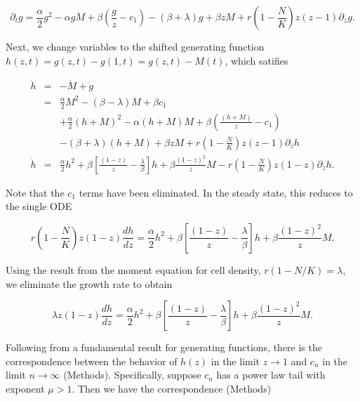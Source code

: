 \documentclass[12pt]{article}
\def\be{\begin{equation}}
\def\ee{\end{equation}}
\def\bea{\begin{eqnarray}}
\def\eea{\end{eqnarray}}
\begin{document}

\be
\partial_t g = \frac{\alpha}{2}g^2 - \alpha gM + \beta\left(\frac{g}{z} - c_1\right) - (\beta+\lambda)g + \beta zM +r\left(1-\frac{N}{K}\right)z(z-1)\partial_zg.
\ee

\noindent Next, we change variables to the shifted generating function $h(z,t) = g(z,t) - g(1,t) = g(z,t) - M(t)$, which satifies

\bea
\dot{h} 	&=& - \dot{M} + \dot{g} \nonumber\\
			&=&  \frac{\alpha}{2}M^2 -(\beta-\lambda)M + \beta c_1\nonumber\\
				&&+ \frac{\alpha}{2}(h+M)^2 - \alpha (h+M)M + \beta\left(\frac{(h+M)}{z} - c_1\right) \nonumber\\
				&&- (\beta+\lambda)(h+M) + \beta zM +r\left(1-\frac{N}{K}\right)z(z-1)\partial_zh\nonumber\\
\dot{h}		&=& \frac{\alpha}{2}h^2 + \beta \left[\frac{(1-z)}{z} - \frac{\lambda}{\beta}\right]h + \beta\frac{(1-z)^2}{z}M - r\left(1-\frac{N}{K}\right)z(1-z)\partial_zh.
\eea

Note that the $c_1$ terms have been eliminated. In the steady state, this reduces to the single ODE

\be
r\left(1-\frac{N}{K}\right)z(1-z)\frac{dh}{dz} = \frac{\alpha}{2}h^2 + \beta \left[\frac{(1-z)}{z} - \frac{\lambda}{\beta}\right]h + \beta\frac{(1-z)^2}{z}M. 
\ee

\noindent Using the result from the moment equation for cell density, $r(1-N/K) = \lambda$, we eliminate the growth rate to obtain

\be
\lambda z(1-z)\frac{dh}{dz} = \frac{\alpha}{2}h^2 + \beta \left[\frac{(1-z)}{z} - \frac{\lambda}{\beta}\right]h + \beta\frac{(1-z)^2}{z}M. 
\ee

Following from a fundamental result for generating functions, there is the correspondence between the behavior of $h(z)$ in the limit $z\to 1$ and $c_n$ in the limit $n\to \infty$ (Methods). Specifically, suppose $c_n$ has a power law tail with exponent $\mu > 1$. Then we have the correspondence (Methods)
\end{document}
